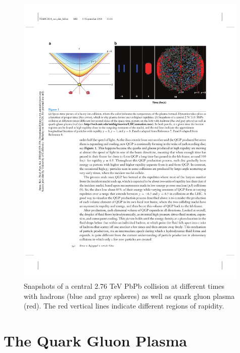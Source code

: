 \begin{figure}[htpb]
  \centering
  \includegraphics[width=0.99\textwidth]{Introduction/collision_snapshot.pdf}
  \caption{Snapshots of a central 2.76 TeV PbPb collision at different times with hadrons (blue and gray spheres) as well as quark gluon plasma (red). The red vertical lines indicate different regions of rapidity.}
  \label{fig:collision_snapshot}
\end{figure}


\section{The Quark Gluon Plasma}\label{sec:QGP}

